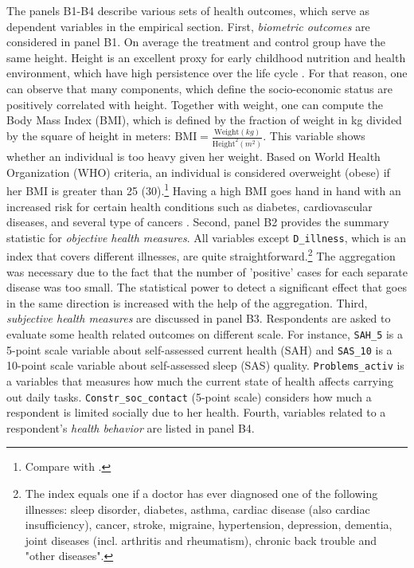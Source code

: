 \documentclass[a4paper ]{article}
\begin{document}
The panels B1-B4 describe various sets of health outcomes, which serve as dependent variables in the empirical section.\newline
First, \textit{biometric outcomes} are considered in panel B1. On average the treatment and control group have the same height. Height is an excellent proxy for early childhood nutrition and health environment, which have high persistence over the life cycle \citep{case2008height}. For that reason, one can observe that many components, which define the socio-economic status are positively correlated with height. Together with weight, one can compute the Body Mass Index (BMI), which is defined by the fraction of weight in kg divided by the square of height in meters: $\text{BMI}=\tfrac{\text{Weight} (kg)}{\text{Height}^2 (m^2)}$. This variable shows whether an individual is too heavy given her weight. Based on World Health Organization (WHO) criteria, an individual is considered overweight (obese) if her BMI is greater than 25 (30).\footnote{Compare with \cite{obesity2000preventing}.}  Having a high BMI goes hand in hand with an increased risk for certain health conditions such as diabetes, cardiovascular diseases, and several type of cancers \citep{winter2014they}.\newline
Second, panel B2 provides the summary statistic for \textit{objective health measures}. All variables except \texttt{D\_illness}, which is an index that covers different illnesses, are quite straightforward.\footnote{The index equals one if a doctor has ever diagnosed one of the following illnesses: sleep disorder, diabetes, asthma, cardiac disease (also cardiac insufficiency), cancer, stroke, migraine, hypertension, depression, dementia, joint diseases (incl. arthritis and rheumatism), chronic back trouble and "other diseases".} The aggregation was necessary due to the fact that the number of 'positive' cases for each separate disease was too small. The statistical power to detect a significant effect that goes in the same direction is increased with the help of the aggregation.\newline
Third, \textit{subjective health measures} are discussed in panel B3. Respondents are asked to evaluate some health related outcomes on different scale. For instance, \texttt{SAH\_5} is a 5-point scale variable about self-assessed current health (SAH) and \texttt{SAS\_10} is a 10-point scale variable about self-assessed sleep (SAS) quality. \texttt{Problems\_activ} is a variables that measures how much the current state of health affects carrying out daily tasks. \texttt{Constr\_soc\_contact} (5-point scale) considers how much a respondent is limited socially due to her health.\newline
Fourth, variables related to a respondent's \textit{health behavior} are listed in panel B4.
\end{document}
